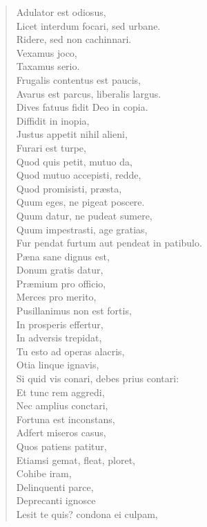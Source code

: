 \documentclass[12pt,  postvopaper]{memoir}
\begin{document}
\begin{verse}
  Adulator est odiosus,\\
  Licet interdum focari, sed urbane.\\
  Ridere, sed non cachinnari.\\
  Vexamus joco,\\
  Taxamus serio.\\
  Frugalis contentus est paucis,\\
  Avarus est parcus, liberalis largus.\\
  Dives fatuus fidit Deo in copia.\\
  Diffidit in inopia,\\
  Justus appetit nihil alieni,\\
  Furari est turpe,\\
  Quod quis petit, mutuo da,\\
  Quod mutuo accepisti, redde,\\
  Quod promisisti, præsta,\\
  Quum eges, ne pigeat poscere.\\
  Quum datur, ne pudeat sumere,\\
  Quum impestrasti, age gratias,\\
  Fur pendat furtum aut pendeat in patibulo.\\
  Pæna sane dignus est,\\
  Donum gratis datur,\\
  Præmium pro officio,\\
  Merces pro merito,\\
  Pusillanimus non est fortis,\\
  In prosperis effertur,\\
  In adversis trepidat,\\
  Tu esto ad operas alacris,\\
  Otia linque ignavis,\\
  Si quid vis conari, debes prius contari:\\
  Et tunc rem aggredi,\\
  Nec amplius conctari,\\
  Fortuna est inconstans,\\
  Adfert miseros casus,\\
  Quos patiens patitur,\\
  Etiamsi gemat, fleat, ploret,\\
  Cohibe iram,\\
  Delinquenti parce,\\
  Deprecanti ignosce\\
  Lesit te quis? condona ei culpam,\\

\end{verse}
\end{document}
